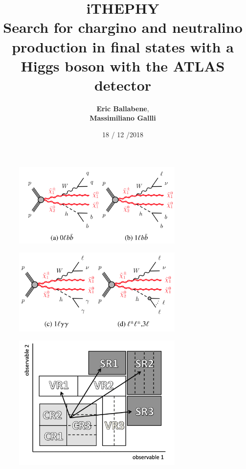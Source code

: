 \documentclass{beamer}
\institute{Universit\`a di Bologna\\Corso di Laurea in Fisica}
\title[Chargino and neutralino production in final states]{iTHEPHY \\
Search for chargino and neutralino production in final states with a Higgs boson with the ATLAS detector}
\author{\textbf{Eric Ballabene},\\ \textbf{Massimiliano Gallli}}
\date{18 / 12 /2018}
\begin{document}
\begin{frame}
\titlepage
\end{frame}


\begin{frame}{}
\begin{figure}
\includegraphics[width=0.75\textwidth]{fourchannel1}
\end{figure}
\begin{figure}
\includegraphics[width=0.75\textwidth]{fourchannel2}
\end{figure}
\end{frame}

\begin{frame}
\begin{figure}
\includegraphics[width=0.75\textwidth]{regions}
\end{figure}
\end{frame}
\end{document}
